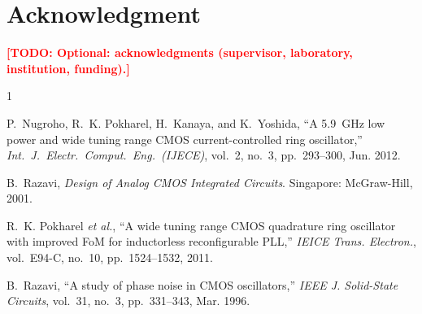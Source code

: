 \documentclass[conference]{IEEEtran}
\newcommand{\TODO}[1]{\textcolor{red}{\textbf{[TODO: #1]}}}
\begin{document}
\section*{Acknowledgment}
\TODO{Optional: acknowledgments (supervisor, laboratory, institution, funding).}

\begin{thebibliography}{1}

P.~Nugroho, R.~K. Pokharel, H.~Kanaya, and K.~Yoshida, ``A 5.9~GHz low power and
wide tuning range CMOS current-controlled ring oscillator,'' \emph{Int.\ J.\
Electr.\ Comput.\ Eng.\ (IJECE)}, vol.~2, no.~3, pp.~293--300, Jun. 2012.

B.~Razavi, \emph{Design of Analog CMOS Integrated Circuits}. Singapore:
McGraw-Hill, 2001.

R.~K. Pokharel \emph{et al.}, ``A wide tuning range CMOS quadrature ring
oscillator with improved FoM for inductorless reconfigurable PLL,'' \emph{IEICE
Trans. Electron.}, vol.~E94-C, no.~10, pp.~1524--1532, 2011.

B.~Razavi, ``A study of phase noise in CMOS oscillators,'' \emph{IEEE J.
Solid-State Circuits}, vol.~31, no.~3, pp.~331--343, Mar. 1996.

\end{thebibliography}
\end{document}
